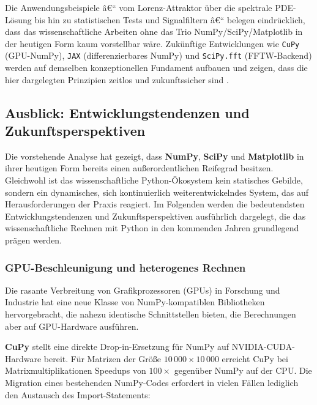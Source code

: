 \documentclass[12pt, a4paper]{article}
\begin{document}
Die Anwendungsbeispiele â€“ vom Lorenz-Attraktor über die spektrale PDE-Lösung
bis hin zu statistischen Tests und Signalfiltern â€“ belegen eindrücklich, dass
das wissenschaftliche Arbeiten ohne das Trio NumPy/SciPy/Matplotlib in der
heutigen Form kaum vorstellbar wäre. Zukünftige Entwicklungen wie
\texttt{CuPy} (GPU-NumPy), \texttt{JAX} (differenzierbares NumPy) und
\texttt{SciPy.fft} (FFTW-Backend) werden auf demselben konzeptionellen
Fundament aufbauen und zeigen, dass die hier dargelegten Prinzipien
zeitlos und zukunftssicher sind \cite{bradbury2018jax}.

\subsection{Ausblick: Entwicklungstendenzen und Zukunftsperspektiven}
\label{subsec:ausblick}

Die vorstehende Analyse hat gezeigt, dass \textbf{NumPy}, \textbf{SciPy}
und \textbf{Matplotlib} in ihrer heutigen Form bereits einen außerordentlichen
Reifegrad besitzen. Gleichwohl ist das wissenschaftliche Python-Ökosystem
kein statisches Gebilde, sondern ein dynamisches, sich kontinuierlich
weiterentwickelndes System, das auf Herausforderungen der Praxis reagiert.
Im Folgenden werden die bedeutendsten Entwicklungstendenzen und
Zukunftsperspektiven ausführlich dargelegt, die das wissenschaftliche
Rechnen mit Python in den kommenden Jahren grundlegend prägen werden.

\subsubsection{GPU-Beschleunigung und heterogenes Rechnen}
\label{subsubsec:gpu}

Die rasante Verbreitung von Grafikprozessoren (GPUs) in Forschung und
Industrie hat eine neue Klasse von NumPy-kompatiblen Bibliotheken
hervorgebracht, die nahezu identische Schnittstellen bieten, die
Berechnungen aber auf GPU-Hardware ausführen.

\textbf{CuPy} \cite{cupy2017} stellt eine direkte Drop-in-Ersetzung für
NumPy auf NVIDIA-CUDA-Hardware bereit. Für Matrizen der Größe
$10\,000 \times 10\,000$ erreicht CuPy bei Matrixmultiplikationen
Speedups von $100\times$ gegenüber NumPy auf der CPU. Die Migration
eines bestehenden NumPy-Codes erfordert in vielen Fällen lediglich den
Austausch des Import-Statements:
\end{document}
